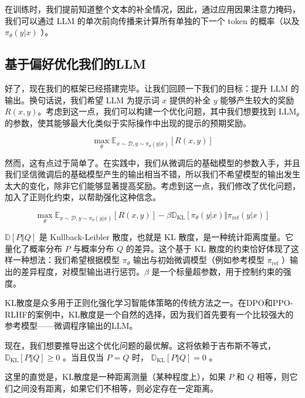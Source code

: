 \documentclass[lang=cn,newtx,10pt,scheme=chinese]{elegantbook}
\begin{document}
在训练时，我们提前知道整个文本的补全情况，因此，通过应用因果注意力掩码，我们可以通过 LLM 的单次前向传播来计算所有单独的下一个 token 的概率（以及 $\pi_\theta(y|x)$ ）。

\subsection{基于偏好优化我们的LLM}

好了，现在我们的框架已经搭建完毕。让我们回顾一下我们的目标：提升 LLM 的输出。换句话说，我们希望 LLM 为提示词 $x$ 提供的补全 $y$ 能够产生较大的奖励$R(x,y)$。考虑到这一点，我们可以构建一个优化问题，其中我们想要找到 $\text{LLM}_{\theta}$ 的参数，使其能够最大化类似于实际操作中出现的提示的预期奖励。

\begin{equation}
\max_\theta\mathbb{E}_{x\sim\mathcal{D},y\sim\pi_\theta(y|x)}[R(x,y)]
\end{equation}

然而，这有点过于简单了。在实践中，我们从微调后的基础模型的参数入手，并且我们坚信微调后的基础模型产生的输出相当不错，所以我们不希望模型的输出发生太大的变化，除非它们能够显著提高奖励。考虑到这一点，我们修改了优化问题，加入了正则化约束，以帮助强化这种信念。

\begin{equation}
\max_\theta\mathbb{E}_{x\sim\mathcal{D},y\sim\pi_\theta(y|x)}[R(x,y)]-\beta\mathbb{D}_\text{KL}[\pi_\theta(y|x)\Vert\pi_\text{ref}(y|x)]
\end{equation}

$\mathbb{D}[P\Vert Q]$ 是 Kullback-Leibler 散度，也就是 KL 散度，是一种统计距离度量。它量化了概率分布 $P$ 与概率分布 $Q$ 的差异。这个基于 KL 散度的约束恰好体现了这样一种想法：我们希望根据模型 $\pi_\theta$ 输出与初始微调模型（例如参考模型 $\pi_\text{ref}$ ）输出的差异程度，对模型输出进行惩罚。$\beta$ 是一个标量超参数，用于控制约束的强度。

KL散度是众多用于正则化强化学习智能体策略的传统方法之一。在DPO和PPO-RLHF的案例中，KL散度是一个自然的选择，因为我们首先要有一个比较强大的参考模型——微调程序输出的LLM。

现在，我们想要推导出这个优化问题的最优解。这将依赖于吉布斯不等式，$\mathbb{D}_\text{KL}[P\Vert Q]\ge 0$ 。当且仅当 $P=Q$ 时， $\mathbb{D}_\text{KL}[P\Vert Q]=0$ 。

这里的直觉是，KL散度是一种距离测量（某种程度上），如果 $P$ 和 $Q$ 相等，则它们之间没有距离，如果它们不相等，则必定存在一定距离。
\end{document}
